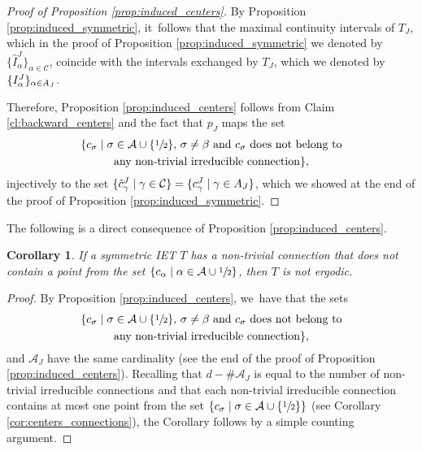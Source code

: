 \documentclass[10pt,a4paper]{amsart}
\theoremstyle{plain}
\newtheorem{corollary}[theorem]{Corollary}
\theoremstyle{definition}
\newcommand{\A}{\mathcal{A}}
\begin{document}
\begin{proof}[Proof of Proposition \ref{prop:induced_centers}]
By Proposition \ref{prop:induced_symmetric}, it~follows that the maximal continuity intervals of $T_J$, which in the proof of Proposition \ref{prop:induced_symmetric} we denoted by $\{\hat I^J_{\alpha}\}_{\alpha\in\mathcal C}$, coincide with the intervals exchanged by $T_J$, which we denoted by $\{I^J_{\alpha}\}_{\alpha\in\mathcal \A_J}$.

Therefore, Proposition \ref{prop:induced_centers} follows from Claim \ref{cl:backward_centers} and the fact that $p_J$ maps the set
\begin{multline*}
\{c _\sigma \mid \sigma \in \A \cup \{\sfrac{1}{2}\},\, \sigma \neq \beta \text{ and } c_\sigma \text{ does not belong to}\\
\text{any non-trivial irreducible connection}\},
\end{multline*}
injectively to the set $\{\hat c_\gamma^J \mid \gamma \in \mathcal C\} = \{c_\gamma^J \mid \gamma \in \mathcal \A_J\}$, which we showed at the end of the proof of Proposition \ref{prop:induced_symmetric}.
\end{proof}

The following is a direct consequence of Proposition \ref{prop:induced_centers}.

\begin{corollary}\label{cor: emptyconnection}
If a symmetric IET $T$ has a non-trivial connection that does not contain a point from the set $\{c_{\alpha} \mid \alpha \in \A \cup \sfrac{1}{2}\}$, then $T$ is not ergodic.
\end{corollary}
{

\begin{proof} By Proposition \ref{prop:induced_centers}, we~have that the sets
\begin{multline*}
\{c _\sigma \mid \sigma \in \A \cup \{\sfrac{1}{2}\},\, \sigma \neq \beta \text{ and } c_\sigma \text{ does not belong to}\\
\text{any non-trivial irreducible connection}\},
\end{multline*}
and $\A_J$
have the same cardinality (see the end of the proof of Proposition \ref{prop:induced_centers}). Recalling that $d-\#\A_J$ is equal to the number of non-trivial irreducible connections and that each non-trivial irreducible connection contains at most one point from the set $\{c _\sigma \mid \sigma \in \A \cup \{\sfrac{1}{2}\}\} $ (see Corollary \ref{cor:centers_connections}), the Corollary follows by a simple counting argument.
\end{proof}}
\end{document}
